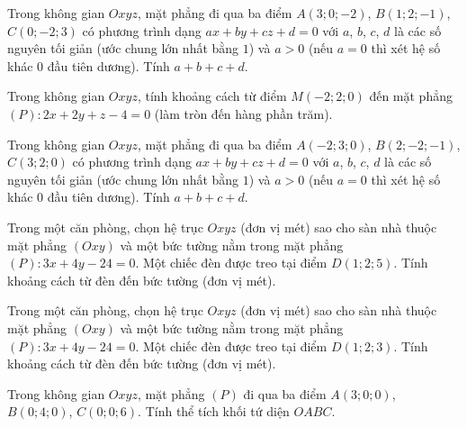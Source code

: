 \begin{bai}Trong không gian $Oxyz$, mặt phẳng đi qua ba điểm $A(3;0;-2)$, $B(1;2;-1)$, $C(0;-2;3)$ có phương trình dạng $ax+by+cz+d=0$ với $a$, $b$, $c$, $d$ là các số nguyên tối giản (ước chung lớn nhất bằng $1$) và $a>0$ (nếu $a=0$ thì xét hệ số khác $0$ đầu tiên dương). Tính $a+b+c+d$.\otraloi{}\end{bai}
\begin{bai}Trong không gian $Oxyz$, tính khoảng cách từ điểm $M(-2;2;0)$ đến mặt phẳng $(P)\colon 2x+2y+z-4=0$ (làm tròn đến hàng phần trăm).\otraloi{}\end{bai}
\begin{bai}Trong không gian $Oxyz$, mặt phẳng đi qua ba điểm $A(-2;3;0)$, $B(2;-2;-1)$, $C(3;2;0)$ có phương trình dạng $ax+by+cz+d=0$ với $a$, $b$, $c$, $d$ là các số nguyên tối giản (ước chung lớn nhất bằng $1$) và $a>0$ (nếu $a=0$ thì xét hệ số khác $0$ đầu tiên dương). Tính $a+b+c+d$.\otraloi{}\end{bai}
\begin{bai}Trong một căn phòng, chọn hệ trục $Oxyz$ (đơn vị mét) sao cho sàn nhà thuộc mặt phẳng $(Oxy)$ và một bức tường nằm trong mặt phẳng $(P)\colon 3x+4y-24=0$. Một chiếc đèn được treo tại điểm $D(1;2;5)$. Tính khoảng cách từ đèn đến bức tường (đơn vị mét).\otraloi{}\end{bai}
\begin{bai}Trong một căn phòng, chọn hệ trục $Oxyz$ (đơn vị mét) sao cho sàn nhà thuộc mặt phẳng $(Oxy)$ và một bức tường nằm trong mặt phẳng $(P)\colon 3x+4y-24=0$. Một chiếc đèn được treo tại điểm $D(1;2;3)$. Tính khoảng cách từ đèn đến bức tường (đơn vị mét).\otraloi{}\end{bai}
\begin{bai}Trong không gian $Oxyz$, mặt phẳng $(P)$ đi qua ba điểm $A(3;0;0)$, $B(0;4;0)$, $C(0;0;6)$. Tính thể tích khối tứ diện $OABC$.\otraloi{}\end{bai}
